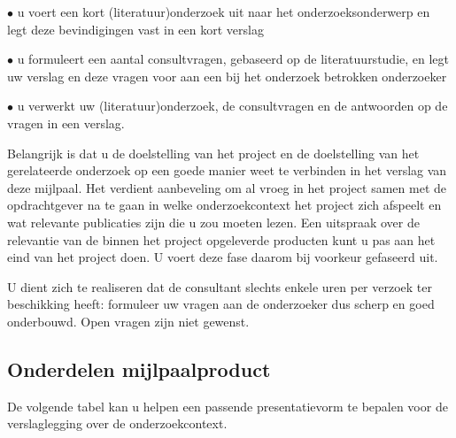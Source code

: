 \par $\bullet$ u voert een kort (literatuur)onderzoek uit naar het onderzoeksonderwerp
en legt deze bevindigingen vast in een kort verslag
\par $\bullet$ u formuleert een aantal consultvragen, gebaseerd op de literatuurstudie,
en legt uw verslag en deze vragen voor aan een bij het onderzoek betrokken
onderzoeker
\par $\bullet$ u verwerkt uw (literatuur)onderzoek, de consultvragen en de antwoorden
op de vragen in een verslag.

Belangrijk is dat u de doelstelling van het project en de doelstelling van
het gerelateerde onderzoek op een goede manier weet te verbinden in het verslag
van deze mijlpaal. Het verdient aanbeveling om al vroeg in het project samen met de
opdrachtgever na te gaan in welke onderzoekcontext het project zich afspeelt en
wat relevante publicaties zijn die u zou moeten lezen. Een uitspraak over de
relevantie van de binnen het project opgeleverde producten kunt u pas aan het
eind van het project doen. U voert deze fase daarom bij voorkeur gefaseerd uit.

U dient zich te realiseren dat de consultant slechts enkele uren per verzoek
ter beschikking heeft: formuleer uw vragen aan de onderzoeker dus scherp en goed onderbouwd.
Open vragen zijn niet gewenst.

\subsection{Onderdelen mijlpaalproduct}
     De volgende tabel kan u helpen een passende presentatievorm te bepalen voor
de verslaglegging over de onderzoekcontext.


